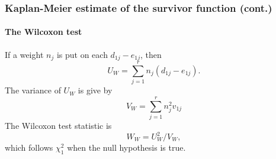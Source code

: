 \documentclass{beamer}
\begin{document}
	\begin{frame}
		\frametitle{Kaplan-Meier estimate of the survivor function (cont.)}
		\framesubtitle{The Wilcoxon test}
		If a weight $n_j$ is put on each $d_{ 1j } - e_{ 1j }$, then
		\[ U_W = \sum_{ j = 1 }^{ r } n_j( d_{ 1j } - e_{ 1j } ). \]
		The variance of $U_W$ is give by
		\[ V_W = \sum_{ j = 1 }^{ r } n_j^2 v_{ 1j } \]
		The Wilcoxon test statistic is 
		\[ W_W = U_W^2 / V_W, \]
		which follows $\chi^2_1$ when the null hypothesis is true.
	\end{frame}
		
	\begin{frame}[allowframebreaks]
		\begin{singlespace}
			
			
		\end{singlespace}
	\end{frame}
\end{document}
